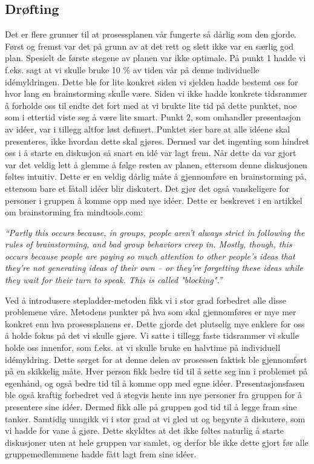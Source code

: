 \subsection{Drøfting}
Det er flere grunner til at prosessplanen vår fungerte så dårlig som den gjorde. Først og fremst var det på grunn av at det rett og slett ikke var en særlig god plan. Spesielt de første stegene av planen var ikke optimale. På punkt 1 hadde vi f.eks. sagt at vi skulle bruke 10 \% av tiden vår på denne individuelle idémyldringen. Dette ble for lite konkret siden vi sjelden hadde bestemt oss for hvor lang en brainstorming skulle være. Siden vi ikke hadde konkrete tidsrammer å forholde oss til endte det fort med at vi brukte lite tid på dette punktet, noe som i ettertid viste seg å være lite smart. Punkt 2, som omhandler presentasjon av idéer, var i tillegg altfor løst definert. Punktet sier bare at alle idéene skal presenteres, ikke hvordan dette skal gjøres. Dermed var det ingenting som hindret oss i å starte en diskusjon så snart en idé var lagt frem. Når dette da var gjort var det veldig lett å glemme å følge resten av planen, ettersom denne diskusjonen føltes intuitiv. Dette er en veldig dårlig måte å gjennomføre en brainstorming på, ettersom bare et fåtall idéer blir diskutert. Det gjør det også vanskeligere for personer i gruppen å komme opp med nye idéer. Dette er beskrevet i en artikkel om brainstorming fra mindtools.com\cite{brainstorming}: \newline

\emph{“Partly this occurs because, in groups, people aren’t always strict in following the rules of brainstorming, and bad group behaviors creep in. Mostly, though, this occurs because people are paying so much attention to other people’s ideas that they're not generating ideas of their own – or they're forgetting these ideas while they wait for their turn to speak. This is called "blocking".”} \newline

Ved å introdusere stepladder-metoden fikk vi i stor grad forbedret alle disse problemene våre. Metodens punkter på hva som skal gjennomføres er mye mer konkret enn hva prosessplanens er. Dette gjorde det plutselig mye enklere for oss å holde fokus på det vi skulle gjøre. Vi satte i tillegg faste tidsrammer vi skulle holde oss innenfor, som f.eks. at vi skulle bruke en halvtime på individuell idémyldring. Dette sørget for at denne delen av prosessen faktisk ble gjennomført på en skikkelig måte. Hver person fikk bedre tid til å sette seg inn i problemet på egenhånd, og også bedre tid til å komme opp med egne idéer. Presentasjonsfasen ble også kraftig forbedret ved å stegvis hente inn nye personer fra gruppen for å presentere sine idéer. Dermed fikk alle på gruppen god tid til å legge fram sine tanker. Samtidig unngikk vi i stor grad at vi gled ut og begynte å diskutere, som vi hadde for vane å gjøre. Dette skyldtes at det ikke føltes naturlig å starte diskusjoner uten at hele gruppen var samlet, og derfor ble ikke dette gjort før alle gruppemedlemmene hadde fått lagt frem sine idéer. 
